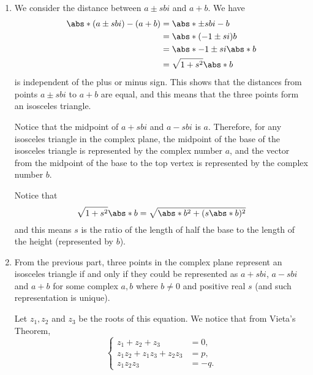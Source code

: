\Question{\currfilebase}

\begin{enumerate}
    \item We consider the distance between \(a \pm sbi\) and \(a + b\). We have
          \begin{align*}
              \abs*{(a \pm sbi) - (a + b)} & = \abs*{\pm sbi - b}        \\
                                           & = \abs*{(-1 \pm si) b}      \\
                                           & = \abs*{-1 \pm si} \abs*{b} \\
                                           & = \sqrt{1 + s^2} \abs*{b}
          \end{align*}
          is independent of the plus or minus sign. This shows that the distances from points \(a \pm sbi\) to \(a + b\) are equal, and this means that the three points form an isosceles triangle.

          Notice that the midpoint of \(a + sbi\) and \(a - sbi\) is \(a\). Therefore, for any isosceles triangle in the complex plane, the midpoint of the base of the isosceles triangle is represented by the complex number \(a\), and the vector from the midpoint of the base to the top vertex is represented by the complex number \(b\).

          Notice that
          \[
              \sqrt{1 + s^2} \abs*{b} = \sqrt{\abs*{b}^2 + (s \abs*{b})^2}
          \]
          and this means \(s\) is the ratio of the length of half the base to the length of the height (represented by \(b\)).

          \begin{center}
              
          \end{center}

    \item From the previous part, three points in the complex plane represent an isosceles triangle if and only if they could be represented as \(a + sbi\), \(a - sbi\) and \(a + b\) for some complex \(a, b\) where \(b \neq 0\) and positive real \(s\) (and such representation is unique).

          Let \(z_1, z_2\) and \(z_3\) be the roots of this equation. We notice that from Vieta's Theorem,
          \[
              \left\{
              \begin{aligned}
                  z_1 + z_2 + z_3             & = 0,  \\
                  z_1 z_2 + z_1 z_3 + z_2 z_3 & = p,  \\
                  z_1 z_2 z_3                 & = -q.
              \end{aligned}
              \right.
          \]


\end{enumerate}
